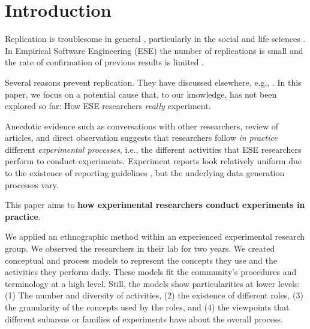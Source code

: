 \section{Introduction}\label{sec-introduction}
Replication is troublesome in general \cite{Klein-2018-many}, particularly in the social and life sciences \cite{Pashler-2012-perspectives,Baker-2016-lid-reproducibility}. In Empirical Software Engineering (ESE) the number of replications is small \cite{Bezerra-2015-Replication-SE-U-SMS} and the rate of confirmation of previous results is limited \cite{Jorgensen-2016-Incorrects-Results-SEE}.

Several reasons prevent replication. They have discussed elsewhere, e.g., \cite{Miller-2005-replicating-SE-experiments,Demagalhaes-2015-replications-SE,cockburn2020threats,mahmood2018reproducibility,dos2022investigating}. In this paper, we focus on a potential cause that, to our knowledge, has not been explored so far: How ESE researchers \textit{really} experiment. 

Anecdotic evidence such as conversations with other researchers, review of articles, and direct observation suggests that researchers follow \textit{in practice} different \textit{experimental processes}, i.e., the different activities that ESE researchers perform to conduct experiments. Experiment reports look relatively uniform due to the existence of reporting guidelines \cite{Carver-2010-guidelines-replication-SE,Jedlitschka-2008-reporting-experiments-SE}, but the underlying data generation processes vary.

This paper aims to  \textbf{how experimental researchers conduct experiments in practice}. 

We applied an ethnographic method \cite{Sharp-2016-Ethnographic-Studies-ESE,zhang2019ethnographic} within an experienced experimental research group. We observed the researchers in their lab for two years. We created conceptual and process models to represent the concepts they use and the activities they perform daily. These models fit the community's procedures and terminology at a high level. Still, the models show particularities at lower levels: (1) The number and diversity of activities, (2) the existence of different roles, (3) the granularity of the concepts used by the roles, and (4) the viewpoints that different subareas or families of experiments have about the overall process.

